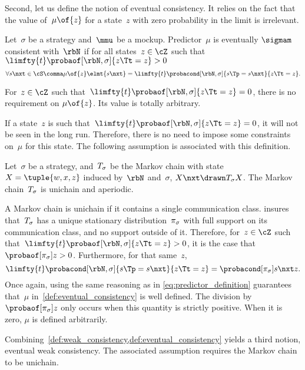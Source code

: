 Second, let us define the notion of eventual consistency.
It relies on the fact that the value of~\(\mu \of{z}\) for a state~\(z\) with zero probability in the limit is irrelevant.

\begin{definition}
\label{def:eventual_consistency}
Let~\(\sigma\) be a strategy and~\(\mmu\) be a mockup.
Predictor~\(\mu\) is eventually \(\sigmam\) consistent with~\(\rbN\) if for all states~\(z \in \cZ\) such that \(\limfty{t} \probaof[\rbN, \sigma]{z\Tt = z} > 0\)
\[
\forall s\nxt \in \cS\comma \mu \of{z} \elmt{s\nxt} = \limfty{t} \probacond[\rbN, \sigma]{s\Tp = s\nxt}{z\Tt = z}.
\]

For~\(z \in \cZ\) such that~\(\limfty{t} \probaof[\rbN, \sigma]{z\Tt = z} = 0\), there is no requirement on \(\mu \of {z}\).
Its value is totally arbitrary.
\end{definition}

If a state~\(z\) is such that~\(\limfty{t} \probaof[\rbN, \sigma]{z\Tt = z} = 0\), it will not be seen in the long run.
Therefore, there is no need to impose some constraints on~\(\mu\) for this state.
The following assumption is associated with this definition.

\begin{assumption}
\label{ass:eventual_ergodicity}
Let~\(\sigma\) be a strategy, and~\(T_{\sigma}\) be the Markov chain with state~\(X = \tuple{w, x, z}\) induced by~\(\rbN\) and~\(\sigma\), \(X\nxt \drawn T\strat{\sigma} X\).
The Markov chain~\(T_{\sigma}\) is unichain and aperiodic.
\end{assumption}

A Markov chain is unichain if it contains a single communication class.
 insures that~\(T_{\sigma}\) has a unique stationary distribution~\(\pi_{\sigma}\) with full support on its communication class, and no support outside of it.
Therefore, for~\(z \in \cZ\) such that~\(\limfty{t} \probaof[\rbN, \sigma]{z\Tt = z} > 0\), it is the case that~\(\probaof[\pi\strat{\sigma}]{z} > 0\).
Furthermore, for that same~\(z\),
\[
\limfty{t} \probacond[\rbN, \sigma]{s\Tp = s\nxt}{z\Tt = z} = \probacond[\pi\strat{\sigma}]{s\nxt}{z}.
\]
Once again, using the same reasoning as in \cref{eq:predictor_definition} guarantees that~\(\mu\) in~\cref{def:eventual_consistency} is well defined.
The division by~\(\probaof[\pi\strat{\sigma}]{z}\) only occurs when this quantity is strictly positive.
When it is zero, \(\mu\) is defined arbitrarily.

Combining~\cref{def:weak_consistency,def:eventual_consistency} yields a third notion, eventual weak consistency.
The associated assumption requires the Markov chain to be unichain.

